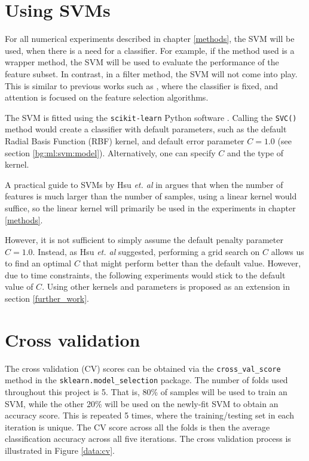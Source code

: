\documentclass[12pt, twoside, a4paper]{report}
\begin{document}
\section{Using SVMs} \label{data:svms}

For all numerical experiments described in chapter \ref{methods}, the SVM will be used, when there is a need for a classifier. For example, if the method used is a wrapper method, the SVM will be used to evaluate the performance of the feature subset. In contrast, in a filter method, the SVM will not come into play. This is similar to previous works such as \cite{RefWorks:216}, where the classifier is fixed, and attention is focused on the feature selection algorithms.

The SVM is fitted using the \texttt{scikit-learn} Python software \cite{scikit-learn}. Calling the \texttt{SVC()} method would create a classifier with default parameters, such as the default Radial Basis Function (RBF) kernel, and default error parameter $C=1.0$ (see section \ref{bg:ml:svm:model}). Alternatively, one can specify $C$ and the type of kernel.

A practical guide to SVMs by Hsu \textit{et. al} in \cite{RefWorks:128} argues that when the number of features is much larger than the number of samples, using a linear kernel would suffice, so the linear kernel will primarily be used in the experiments in chapter \ref{methods}.


However, it is not sufficient to simply assume the default penalty parameter $C=1.0$. Instead, as Hsu \textit{et. al} suggested, performing a grid search on $C$ allows us to find an optimal $C$ that might perform better than the default value. However, due to time constraints, the following experiments would stick to the default value of $C$. Using other kernels and parameters is proposed as an extension in section \ref{further_work}.



\section{Cross validation}
The cross validation (CV) scores can be obtained via the \texttt{cross\_val\_score} method in the \texttt{sklearn.model\_selection} package. The number of folds used throughout this project is 5. That is, 80\% of samples will be used to train an SVM, while the other 20\% will be used on the newly-fit SVM to obtain an accuracy score. This is repeated 5 times, where the training/testing set in each iteration is unique. The CV score across all the folds is then the average classification accuracy across all five iterations. The cross validation process is illustrated in Figure \ref{data:cv}.
\end{document}
